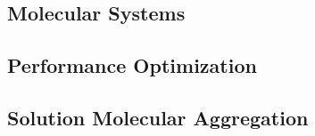 \documentclass[../thesis.tex]{subfiles}
\begin{document}
\subsection{Molecular Systems}
\subsection{Performance Optimization}
\subsection{Solution Molecular Aggregation}
\end{document}
